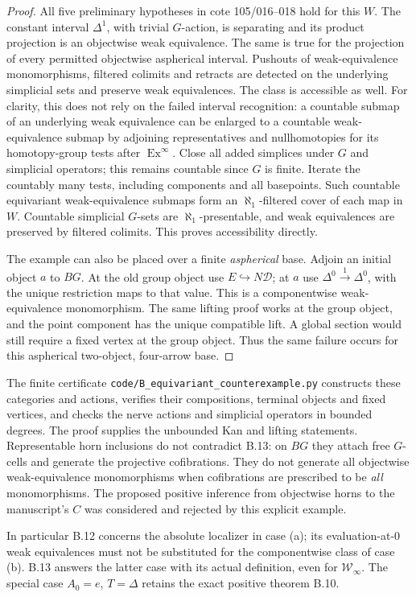\begin{proof}
All five preliminary hypotheses in cote 105/016--018 hold for this
$W$.  The constant interval $\Delta^1$, with trivial $G$-action,
is separating and its product projection is an objectwise weak
equivalence.  The same is true for the projection of every permitted
objectwise aspherical interval.  Pushouts of weak-equivalence
monomorphisms, filtered colimits and retracts are detected on the
underlying simplicial sets and preserve weak equivalences.
The class is accessible as well.  For clarity, this does not rely on
the failed interval recognition: a countable submap of an underlying
weak equivalence can be enlarged to a countable weak-equivalence
submap by adjoining representatives and nullhomotopies for its
homotopy-group tests after $\operatorname{Ex}^{\infty}$.
Close all added simplices under $G$ and simplicial operators; this
remains countable since $G$ is finite.  Iterate the countably many
tests, including components and all basepoints.  Such countable
equivariant weak-equivalence submaps form an $\aleph_1$-filtered cover
of each map in $W$.  Countable simplicial $G$-sets are
$\aleph_1$-presentable, and weak equivalences are preserved by
filtered colimits.  This proves accessibility directly.

The example can also be placed over a finite \emph{aspherical} base.
Adjoin an initial object $a$ to $BG$.  At the old group object use
$E\hookrightarrow N\mathcal D$; at $a$ use
$\Delta^0\xrightarrow{1}\Delta^0$, with the unique restriction maps
to that value.  This is a componentwise weak-equivalence
monomorphism.  The same lifting proof works at the group object,
and the point component has the unique compatible lift.  A global
section would still require a fixed vertex at the group object.
Thus the same failure occurs for this aspherical two-object,
four-arrow base.
\end{proof}

The finite certificate \texttt{code/B\_equivariant\_counterexample.py}
constructs these categories and actions, verifies their compositions,
terminal objects and fixed vertices, and checks the nerve actions and
simplicial operators in bounded degrees.  The proof supplies the
unbounded Kan and lifting statements.  Representable horn inclusions
do not contradict B.13: on $BG$ they attach free $G$-cells and generate
the projective cofibrations.  They do not generate all objectwise
weak-equivalence monomorphisms when cofibrations are prescribed to be
\emph{all} monomorphisms.  The proposed positive inference from
objectwise horns to the manuscript's $C$ was considered and rejected
by this explicit example.

In particular B.12 concerns the absolute localizer in case (a); its
evaluation-at-$0$ weak equivalences must not be substituted for the
componentwise class of case (b).  B.13 answers the latter case with its
actual definition, even for $\mathcal W_\infty$.  The special case
$A_0=e$, $T=\Delta$ retains the exact positive theorem B.10.
